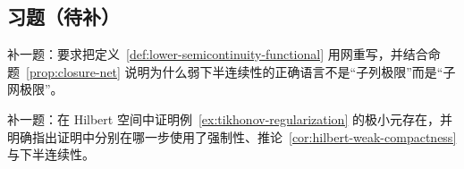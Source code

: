 \subsection*{习题（待补）}

\begin{exercise}[弱下半连续判别占位]\label{exr:weak-lsc-placeholder}
补一题：要求把定义~\ref{def:lower-semicontinuity-functional} 用网重写，并结合命题~\ref{prop:closure-net} 说明为什么弱下半连续性的正确语言不是“子列极限”而是“子网极限”。
\end{exercise}

\begin{exercise}[直接法桥接题占位]\label{exr:direct-method-reflexive-placeholder}
补一题：在 Hilbert 空间中证明例~\ref{ex:tikhonov-regularization} 的极小元存在，并明确指出证明中分别在哪一步使用了强制性、推论~\ref{cor:hilbert-weak-compactness} 与下半连续性。
\end{exercise}
